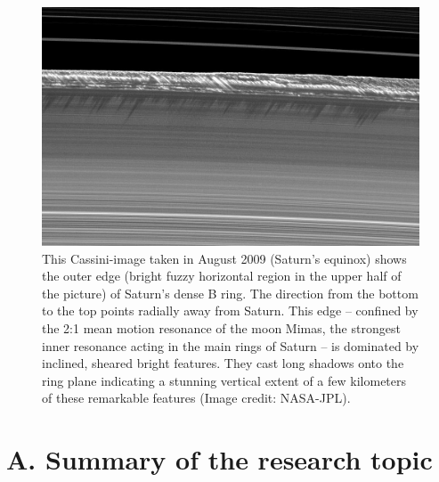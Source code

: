 \documentclass[11pt, notitlepage]{article} %
\begin{document}
 
 \begin{figure}[ht]
	\centerline{
	\includegraphics[width=.7\textwidth]{Figures/B_Ring_Edge.png}
	}
	\caption{\small%
%
This Cassini-image taken in August 2009 (Saturn's equinox) shows the outer edge (bright fuzzy horizontal region in the upper 
half of the picture) of  Saturn's dense B ring. The direction from the bottom to the top points radially away from Saturn.  This edge 
-- confined by the 2:1 mean motion resonance of the moon Mimas, the strongest inner resonance acting in the main rings of 
Saturn --  is dominated by inclined, sheared bright features. They cast long shadows onto the ring plane indicating a stunning 
vertical extent of a few kilometers  of these remarkable features (Image credit: NASA-JPL).
%
}
\label{B_edge_Alpen}
\end{figure}
 
    



\newpage

\section*{A. Summary of the research topic}
\end{document}
